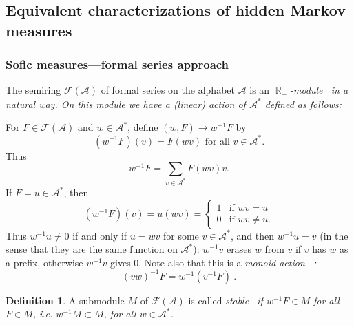 \documentclass{kepart2010}
\theoremstyle{plain}
\theoremstyle{definition}
\newtheorem{defn}[thm]{Definition}
\theoremstyle{remark}
\theoremstyle{definition}
\numberwithin{equation}{section}
\begin{document}
\subsection{Equivalent characterizations of hidden Markov measures}

\subsubsection{Sofic measures---formal series approach}

The semiring ${\mathcal F ({{\mathcal A}})}$ of formal series on the alphabet ${{\mathcal A}}$ is an \em
$\operatorname{\mathbb R}_{+}$-module\em~ in a natural way. On this module we have a
{\em {(linear)} action of ${{\mathcal A}}^{*}$} defined as follows:

For $F \in \mathcal{F}({{\mathcal A}})$ and $w\in {{\mathcal A}}^{*}$, define
$(w,F)\rightarrow w^{-1}F$ by
\begin{displaymath}
(w^{-1}F)(v)=F(wv) \textrm{ for all } v\in {{\mathcal A}}^{*}.
\end{displaymath}
Thus
$$w^{-1}F=\sum_{v \in {{\mathcal A}}^{*}}F(wv)v.$$
If $F=u\in {{\mathcal A}}^{*}$, then
$$(w^{-1}F)(v)=u(wv)=
\begin{cases}1 & \text{if $wv=u$}
\\0 & \text{if $wv\neq u.$}\end{cases}$$
Thus $w^{-1}u\neq 0$ if and only if $u=wv$ for some $v\in {{\mathcal A}}^{*}$,
and then $w^{-1}u=v$ (in the sense that they are the same function
on ${{\mathcal A}}^{*}$): $w^{-1}v$ erases $w$ from $v$ if $v$ has $w$ as a
prefix, otherwise $w^{-1}v$ gives 0. Note also that this is a \em
monoid action\em~ :
\begin{equation} \label{monoidtag}
(vw)^{-1}F=w^{-1}(v^{-1}F) \ .
\end{equation}

\begin{defn}
A submodule $M$ of $\mathcal{F}({{\mathcal A}})$ is called \em stable\em~ if
$w^{-1}F\in M$ for all $F\in M$, i.e. $w^{-1}M \subset M$, for all
$w\in {{\mathcal A}}^{*}$.
\end{defn}
\end{document}
